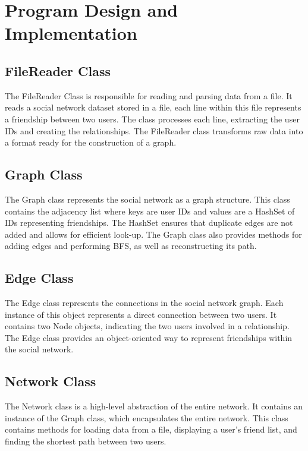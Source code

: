 \section*{Program Design and Implementation}

\subsection*{FileReader Class}
The FileReader Class is responsible for reading and parsing data from a file. It reads a social network dataset stored in a file, each line within this file represents a friendship between two users. The class processes each line, extracting the user IDs and creating the relationships. The FileReader class transforms raw data into a format ready for the construction of a graph.

\subsection*{Graph Class}
The Graph class represents the social network as a graph structure. This class contains the adjacency list where keys are user IDs and values are a HashSet of IDs representing friendships. The HashSet ensures that duplicate edges are not added and allows for efficient look-up. The Graph class also provides methods for adding edges and performing BFS, as well as reconstructing its path.

\subsection*{Edge Class}
The Edge class represents the connections in the social network graph. Each instance of this object represents a direct connection between two users. It contains two Node objects, indicating the two users involved in a relationship. The Edge class provides an object-oriented way to represent friendships within the social network.

\subsection*{Network Class}
The Network class is a high-level abstraction of the entire network. It contains an instance of the Graph class, which encapsulates the entire network. This class contains methods for loading data from a file, displaying a user's friend list, and finding the shortest path between two users.

